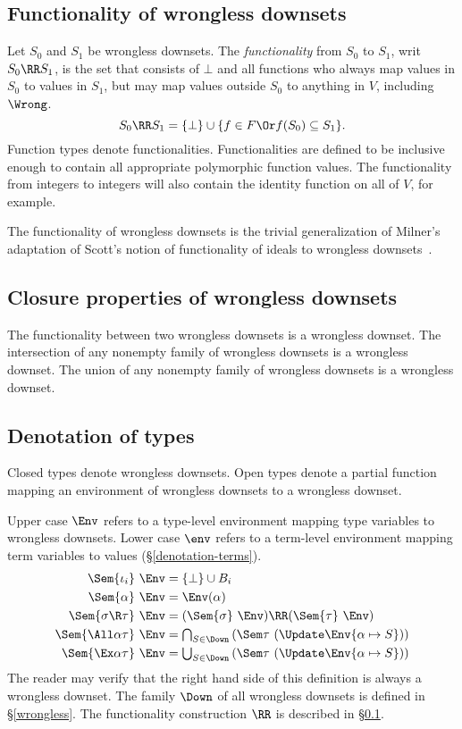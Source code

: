 \documentclass{amsart}
\theoremstyle{definition}
\begin{document}
\subsection{Functionality of wrongless downsets}
\label{functionality}
Let $S_0$ and $S_1$ be wrongless downsets. The
\emph{functionality} from $S_0$ to $S_1$, writ $S_0\RR S_1$, is
the set that consists of $\bot$ and all functions who always map
values in $S_0$ to values in $S_1$, but may map values outside
$S_0$ to anything in $V$, including $\Wrong$.
\[
S_0 \RR S_1 =
\{\bot\}\cup\{f\in F \Or f(S_0) \subseteq S_1\}.
\]
Function types denote functionalities. Functionalities are
defined to be inclusive enough to contain all appropriate
polymorphic function values. The functionality from integers to
integers will also contain the identity function on all of $V$,
for example.

The functionality of wrongless down\-sets is the trivial
generalization of Milner's adaptation of Scott's notion of
functionality of ideals to wrongless downsets~\cite{Milner78}.

\subsection{Closure properties of wrongless downsets}
The functionality between two wrongless downsets is a wrongless
downset. The intersection of any nonempty family of wrongless
downsets is a wrongless downset. The union of any nonempty family
of wrongless downsets is a wrongless downset.

\subsection{Denotation of types}
\label{denotation-types}
Closed types denote wrongless downsets. Open types denote a
partial function mapping an environment of wrongless downsets to
a wrongless downset.

Upper case $\Env$ refers to a type-level environment mapping type
variables to wrongless downsets. Lower case $\env$ refers to a
term-level environment mapping term variables to values
(\S\ref{denotation-terms}).
\begin{align*}
\Sem{\iota_i}~\Env &= \{\bot\}\cup B_i\\
\Sem{\alpha}~\Env &= \Env(\alpha)\\
\Sem{\sigma\R\tau}~\Env&=
  (\Sem{\sigma}~\Env)\RR(\Sem{\tau}~\Env)\\
\Sem{\All\alpha\tau}~\Env&=
  {\textstyle\bigcap_{S\in\Down}}
  \left(\Sem\tau~(\Update\Env{\alpha\mapsto S})\right)\\
\Sem{\Ex\alpha\tau}~\Env&=
  {\textstyle\bigcup_{S\in\Down}}
  \left(\Sem\tau~(\Update\Env{\alpha\mapsto S})\right)
\end{align*}
The reader may verify that the right hand side of this definition
is always a wrongless downset. The family $\Down$ of all
wrongless downsets is defined in \S\ref{wrongless}. The
functionality construction $\RR$ is described in
\S\ref{functionality}.
\end{document}
